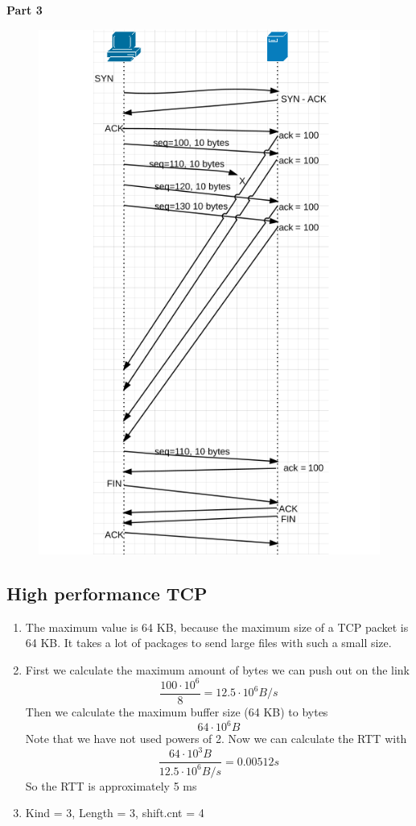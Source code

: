 \noindent \textbf{Part 3}
\begin{figure}[h!]
  \includegraphics[scale=0.5]{tcpstuff.png}
\end{figure}
\newpage
\subsection{High performance TCP}
\begin{enumerate}
\item The maximum value is 64 KB, because the maximum size of a TCP packet is
    64 KB. It takes a lot of packages to send large files with such a small
    size.
\item First we calculate the maximum amount of bytes we can push out on the
    link
    \[
        \frac{100\cdot 10^6}{8} = 12.5 \cdot 10^6 B/s
    \]
    Then we calculate the maximum buffer size (64 KB) to bytes
    \[
        64 \cdot 10^6 B
    \]
    Note that we have not used powers of 2. Now we can calculate the RTT with
    \[
        \frac{64 \cdot 10^3 B}{12.5 \cdot 10^6 B/s} = 0.00512 s
    \]
    So the RTT is approximately 5 ms
\item Kind = 3, Length = 3, shift.cnt = 4
\end{enumerate}

